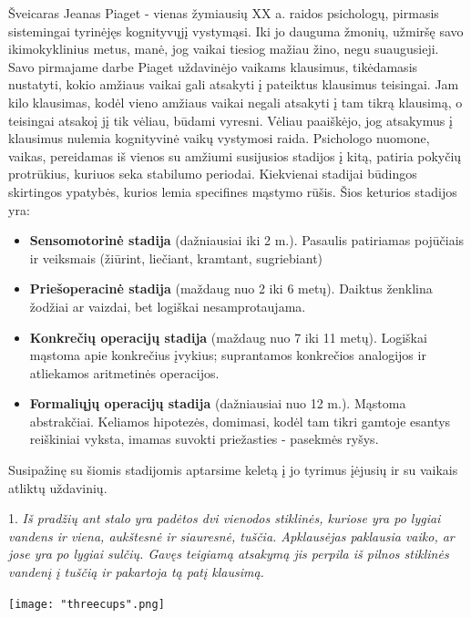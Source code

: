 \documentclass{article}
\begin{document}
Šveicaras Jeanas Piaget - vienas žymiausių XX a. raidos psichologų, pirmasis sistemingai tyrinėjęs kognityvųjį vystymąsi. Iki jo dauguma žmonių, užmiršę savo ikimokyklinius metus, manė, jog vaikai tiesiog mažiau žino, negu suaugusieji. Savo pirmajame darbe Piaget uždavinėjo vaikams klausimus, tikėdamasis nustatyti, kokio amžiaus vaikai gali atsakyti į pateiktus klausimus
teisingai. Jam kilo klausimas, kodėl vieno amžiaus vaikai negali atsakyti į tam tikrą klausimą, o teisingai atsakoį jį tik vėliau, būdami vyresni. Vėliau paaiškėjo, jog atsakymus į klausimus nulemia kognityvinė vaikų vystymosi raida. Psichologo nuomone, vaikas, pereidamas iš vienos su amžiumi susijusios stadijos į kitą, patiria pokyčių protrūkius, kuriuos seka stabilumo
periodai.  Kiekvienai stadijai būdingos skirtingos ypatybės, kurios lemia specifines mąstymo rūšis. Šios keturios stadijos yra:
\begin{itemize}
\item \textbf{Sensomotorinė stadija} (dažniausiai iki 2 m.). Pasaulis patiriamas pojūčiais ir veiksmais (žiūrint, liečiant, kramtant, sugriebiant)
\item \textbf{Priešoperacinė stadija} (maždaug nuo 2 iki 6 metų). Daiktus ženklina žodžiai ar vaizdai, bet logiškai nesamprotaujama.
\item \textbf{Konkrečių operacijų stadija} (maždaug nuo 7 iki 11 metų). Logiškai mąstoma apie konkrečius įvykius; suprantamos
konkrečios analogijos ir atliekamos aritmetinės operacijos.
\item \textbf{Formaliųjų operacijų stadija} (dažniausiai nuo 12 m.). Mąstoma abstrakčiai. Keliamos hipotezės, domimasi, kodėl tam tikri gamtoje esantys reiškiniai vyksta, imamas suvokti priežasties - pasekmės ryšys.

\end{itemize}
Susipažinę su šiomis stadijomis aptarsime keletą į jo tyrimus įėjusių ir su vaikais atliktų uždavinių.

\begin{minipage}[b]{0.73\linewidth} 1. \textit{Iš pradžių ant stalo yra padėtos dvi vienodos stiklinės, kuriose yra po lygiai vandens ir viena, aukštesnė ir siauresnė, tuščia. Apklausėjas paklausia vaiko, ar jose yra po lygiai sulčių. Gavęs teigiamą atsakymą jis perpila iš pilnos stiklinės vandenį į tuščią ir pakartoja tą patį klausimą.} \end{minipage} \hspace{\fill} \begin{minipage}[b]{0.25\linewidth}\texttt{[image: "threecups".png]} \end{minipage}\newline
\end{document}
